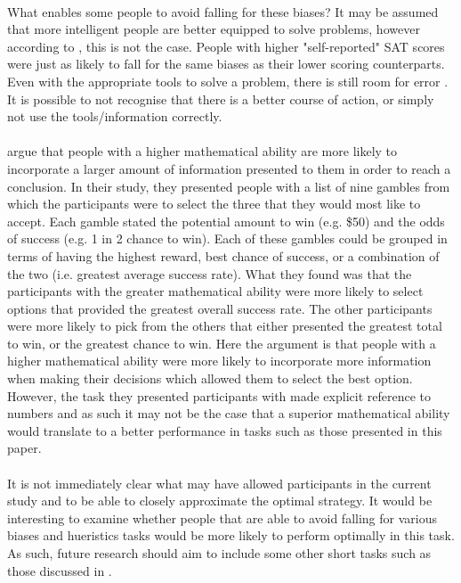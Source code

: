 \documentclass[12pt]{article}
\begin{document}
\paragraph{} What enables some people to avoid falling for these biases? It may be assumed that more intelligent people are better equipped to solve problems, however according to \cite{stanovich2008relative}, this is not the case. People with higher "self-reported" SAT scores were just as likely to fall for the same biases as their lower scoring counterparts. Even with the appropriate tools to solve a problem, there is still room for error \citep{KAHNEMAN1982}. It is possible to not recognise that there is a better course of action, or simply not use the tools/information correctly.  

\paragraph{} \cite{jasper2017numeracy} argue that people with a higher mathematical ability are more likely to incorporate a larger amount of information presented to them in order to reach a conclusion. In their study, they presented people with a list of nine gambles from which the participants were to select the three that they would most like to accept. Each gamble stated the potential amount to win (e.g. \$50) and the odds of success (e.g. 1 in 2 chance to win). Each of these gambles could be grouped in terms of having the highest reward, best chance of success, or a combination of the two (i.e. greatest average success rate). What they found was that the participants with the greater mathematical ability were more likely to select options that provided the greatest overall success rate. The other participants were more likely to pick from the others that either presented the greatest total to win, or the greatest chance to win. Here the argument is that people with a higher mathematical ability were more likely to incorporate more information when making their decisions which allowed them to select the best option. However, the task they presented participants with made explicit reference to numbers and as such it may not be the case that a superior mathematical ability would translate to a better performance in tasks such as those presented in this paper. 
  
\paragraph{} It is not immediately clear what may have allowed participants in the current study and \cite{clarke2015failure} to be able to closely approximate the optimal strategy. It would be interesting to examine whether people that are able to avoid falling for various biases and hueristics tasks would be more likely to perform optimally in this task. As such, future research should aim to include some other short tasks such as those discussed in \cite{Toplak2011}. 
\end{document}
